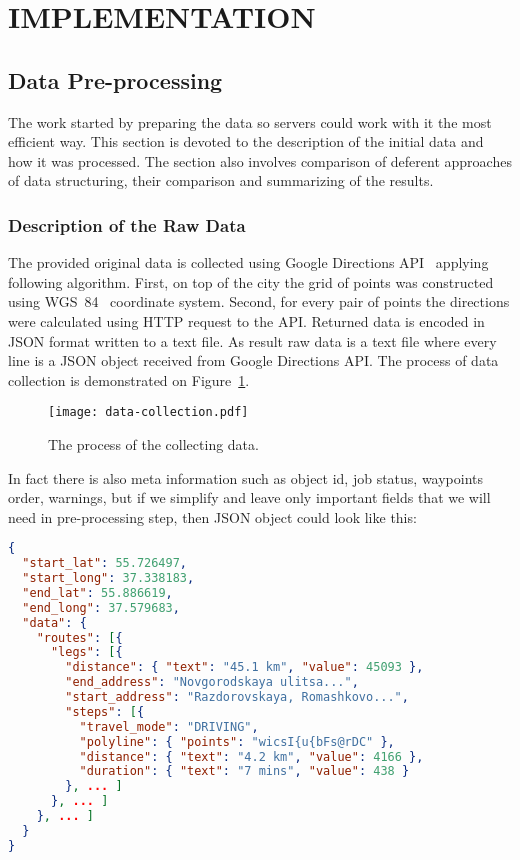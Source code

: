 
\section{ IMPLEMENTATION }
\subsection{ Data Pre-processing }
The work started by preparing the data so servers could work with it the most efficient way. This
section is devoted to the description of the initial data and how it was processed. The section
also involves comparison of deferent approaches of data structuring, their comparison and
summarizing of the results.

\subsubsection{ Description of the Raw Data }
The provided original data is collected using Google Directions API~\cite{google:directions}
applying following algorithm. First, on top of the city the grid of points was constructed
using WGS~84~\cite{wiki:wgs} coordinate system. Second, for every pair of points the
directions were calculated using HTTP request to the API. Returned data is encoded in JSON
format written to a text file. As result raw data is a
text file where every line is a JSON object received from Google Directions API. The process
of data collection is demonstrated on Figure~\ref{pic:collecting_data}.

\begin{figure}[h]
  \centering
  \texttt{[image: data-collection.pdf]}
  \caption{The process of the collecting data.}
  \label{pic:collecting_data}
\end{figure}

In fact there is also meta information such as object id, job status, waypoints order,
warnings, but if we simplify and leave only important fields that we will need in pre-processing
step, then JSON object could look like this:

\begin{lstlisting}[language=json, caption=Google Directions API simplified response example,
      label={lst:google_response}]
{
  "start_lat": 55.726497,
  "start_long": 37.338183,
  "end_lat": 55.886619,
  "end_long": 37.579683,
  "data": {
    "routes": [{
      "legs": [{
        "distance": { "text": "45.1 km", "value": 45093 },
        "end_address": "Novgorodskaya ulitsa...",
        "start_address": "Razdorovskaya, Romashkovo...",
        "steps": [{
          "travel_mode": "DRIVING",
          "polyline": { "points": "wicsI{u{bFs@rDC" },
          "distance": { "text": "4.2 km", "value": 4166 },
          "duration": { "text": "7 mins", "value": 438 }
        }, ... ]
      }, ... ]
    }, ... ]
  }
}
\end{lstlisting}

